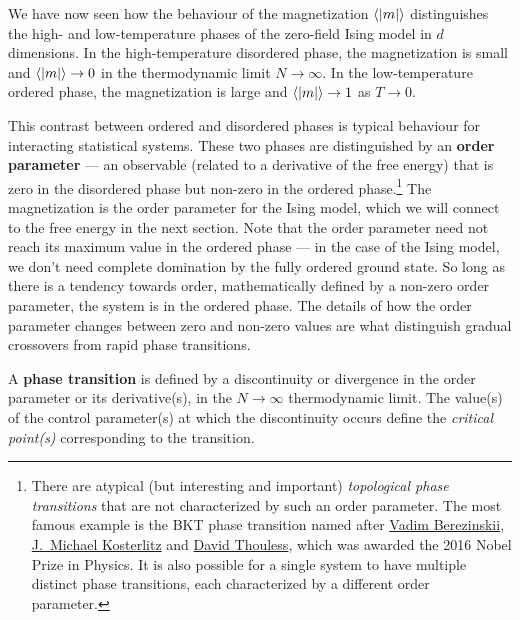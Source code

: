 We have now seen how the behaviour of the magnetization $\left\langle |m| \right\rangle$ distinguishes the high- and low-temperature phases of the zero-field Ising model in $d$ dimensions.
In the high-temperature disordered phase, the magnetization is small and $\left\langle |m| \right\rangle \to 0$ in the thermodynamic limit $N \to \infty$.
In the low-temperature ordered phase, the magnetization is large and $\left\langle |m| \right\rangle \to 1$ as $T \to 0$.

This contrast between ordered and disordered phases is typical behaviour for interacting statistical systems.
These two phases are distinguished by an \textbf{order parameter} --- an observable (related to a derivative of the free energy) that is zero in the disordered phase but non-zero in the ordered phase.\footnote{There are atypical (but interesting and important) \textit{topological phase transitions} that are not characterized by such an order parameter.  The most famous example is the BKT phase transition named after \href{https://en.wikipedia.org/wiki/Vadim_Berezinskii}{Vadim Berezinskii}, \href{https://en.wikipedia.org/wiki/J._Michael_Kosterlitz}{J.\ Michael Kosterlitz} and \href{https://en.wikipedia.org/wiki/David_J._Thouless}{David Thouless}, which was awarded the 2016 Nobel Prize in Physics.  It is also possible for a single system to have multiple distinct phase transitions, each characterized by a different order parameter.}
The magnetization is the order parameter for the Ising model, which we will connect to the free energy in the next section.
Note that the order parameter need not reach its maximum value in the ordered phase --- in the case of the Ising model, we don't need complete domination by the fully ordered ground state.
So long as there is a tendency towards order, mathematically defined by a non-zero order parameter, the system is in the ordered phase.
The details of how the order parameter changes between zero and non-zero values are what distinguish gradual crossovers from rapid phase transitions.

\begin{shaded}
  A \textbf{phase transition} is defined by a discontinuity or divergence in the order parameter or its derivative(s), in the $N \to \infty$ thermodynamic limit.
  The value(s) of the control parameter(s) at which the discontinuity occurs define the \textit{critical point(s)} corresponding to the transition.
\end{shaded}

